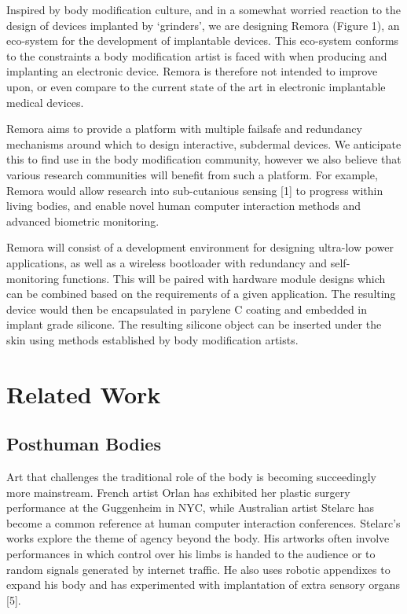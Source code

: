 \documentclass[runningheads,a4paper]{llncs}
\begin{document}
Inspired by body modification culture, and in a somewhat worried reaction to the design of devices implanted by ‘grinders’, we are designing Remora (Figure 1), an eco-system for the development of implantable devices. This eco-system conforms to the constraints a body modification artist is faced with when producing and implanting an electronic device. Remora is therefore not intended to improve upon, or even compare to the current state of the art in electronic implantable medical devices. 

Remora aims to provide a platform with multiple failsafe and redundancy mechanisms around which to design interactive, subdermal devices. We anticipate this to find use in the body modification community, however we also believe that various research communities will benefit from such a platform. For example, Remora would allow research into sub-cutanious sensing [1] to progress within living bodies, and enable novel human computer interaction methods and advanced biometric monitoring. 

Remora will consist of a development environment for designing ultra-low power applications, as well as a wireless bootloader with redundancy and self-monitoring functions. This will be paired with hardware module designs which can be combined based on the requirements of a given application. The resulting device would then be encapsulated in parylene C coating and embedded in implant grade silicone. The resulting silicone object can be inserted under the skin using methods established by body modification artists.
 
\section{Related Work}
\subsection{Posthuman Bodies}
Art that challenges the traditional role of the body is becoming succeedingly more mainstream. French artist Orlan has exhibited her plastic surgery performance at the Guggenheim in NYC, while Australian artist Stelarc has become a common reference at human computer interaction conferences. Stelarc's works explore the theme of agency beyond the body. His artworks often involve performances in which control over his limbs is handed to the audience or to random signals generated by internet traffic. He also uses robotic appendixes to expand his body and has experimented with implantation of extra sensory organs [5].
\end{document}

